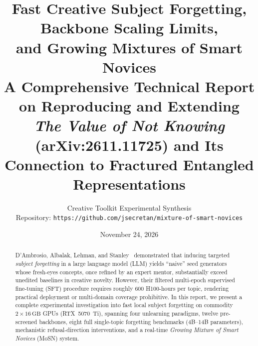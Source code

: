 \documentclass[10.5pt,letterpaper]{article}
\title{\vspace{-1.4em}\textbf{Fast Creative Subject Forgetting, Backbone Scaling Limits,\\and Growing Mixtures of Smart Novices}\\[0.35em]
\large A Comprehensive Technical Report on Reproducing and Extending \emph{The Value of Not Knowing} (arXiv:2611.11725) and Its Connection to Fractured Entangled Representations}
\author{Creative Toolkit Experimental Synthesis\\
\small Repository: \texttt{https://github.com/jsecretan/mixture-of-smart-novices}}
\date{November 24, 2026}
\begin{document}
\maketitle
\vspace{-0.8em}

\begin{abstract}
\noindent D'Ambrosio, Albalak, Lehman, and Stanley~\cite{dambrosio2026value} demonstrated that inducing targeted \emph{subject forgetting} in a large language model (LLM) yields ``naive'' seed generators whose fresh-eyes concepts, once refined by an expert mentor, substantially exceed unedited baselines in creative novelty. However, their filtered multi-epoch supervised fine-tuning (SFT) procedure requires roughly $600$ H100-hours per topic, rendering practical deployment or multi-domain coverage prohibitive. In this report, we present a complete experimental investigation into fast local subject forgetting on commodity $2\times 16\,\text{GB}$ GPUs (RTX~5070~Ti), spanning four unlearning paradigms, twelve pre-screened backbones, eight full single-topic forgetting benchmarks (4B--14B parameters), mechanistic refusal-direction interventions, and a real-time \emph{Growing Mixture of Smart Novices} (MoSN) system.


\end{abstract}
\end{document}
